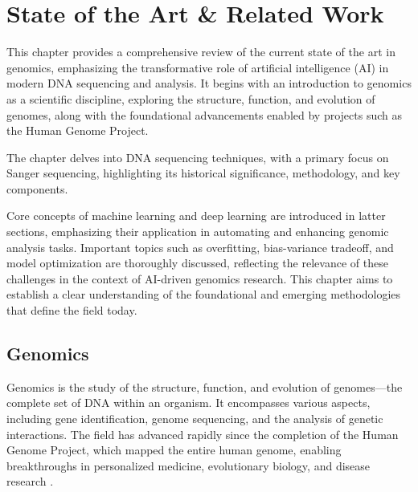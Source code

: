 
%

\chapter{State of the Art \& Related Work}
\label{cha:users_manual}

\glsresetall

This chapter provides a comprehensive review of the current state of the art in genomics, emphasizing the transformative role of artificial intelligence (AI) in modern DNA sequencing and analysis. It begins with an introduction to genomics as a scientific discipline, exploring the structure, function, and evolution of genomes, along with the foundational advancements enabled by projects such as the Human Genome Project. 

The chapter delves into DNA sequencing techniques, with a primary focus on Sanger sequencing, highlighting its historical significance, methodology, and key components. 

Core concepts of machine learning and deep learning are introduced in latter sections, emphasizing their application in automating and enhancing genomic analysis tasks. Important topics such as overfitting, bias-variance tradeoff, and model optimization are thoroughly discussed, reflecting the relevance of these challenges in the context of AI-driven genomics research. This chapter aims to establish a clear understanding of the foundational and emerging methodologies that define the field today.
\section{Genomics}

Genomics is the study of the structure, function, and evolution of genomes—the complete set of DNA within an organism. It encompasses various aspects, including gene identification, genome sequencing, and the analysis of genetic interactions. The field has advanced rapidly since the completion of the Human Genome Project, which mapped the entire human genome, enabling breakthroughs in personalized medicine, evolutionary biology, and disease research \cite{lander2001initial,venter2001human,genome_gov_hgp}.

